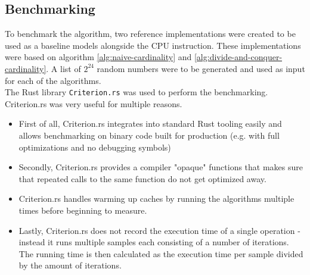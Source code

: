 \subsection{Benchmarking}
To benchmark the algorithm, two reference implementations were created to be used as a baseline models alongside the CPU instruction. These implementations were based on algorithm \ref{alg:naive-cardinality} and \ref{alg:divide-and-conquer-cardinality}. A list of $2^{24}$ random numbers were to be generated and used as input for each of the algorithms.\\
The Rust library \texttt{Criterion.rs}\cite{criterion} was used to perform the benchmarking. Criterion.rs was very useful for multiple reasons. 
\begin{itemize}
    \item First of all, Criterion.rs integrates into standard Rust tooling easily and allows benchmarking on binary code built for production (e.g. with full optimizations and no debugging symbols)
    \item Secondly, Criterion.rs provides a compiler "opaque" functions that makes sure that repeated calls to the same function do not get optimized away.
    \item Criterion.rs handles warming up caches by running the algorithms multiple times before beginning to measure.
    \item Lastly, Criterion.rs does not record the execution time of a single operation - instead it runs multiple samples each consisting of a number of iterations. The running time is then calculated as the execution time per sample divided by the amount of iterations. 
\end{itemize}
